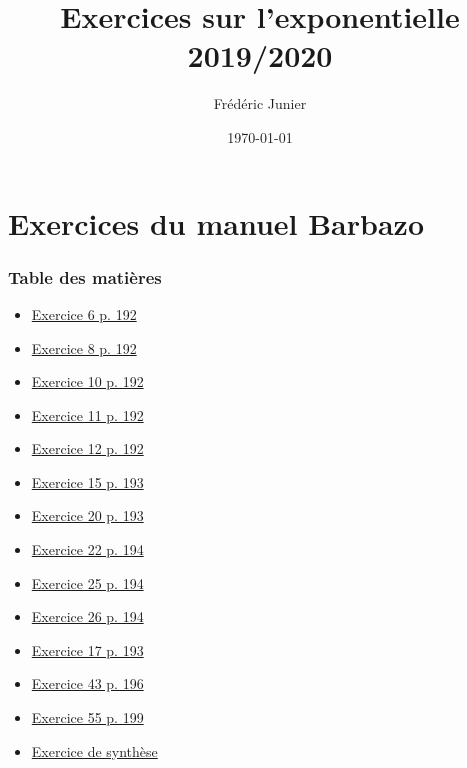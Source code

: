 \documentclass[11pt, hyperref={urlcolor=red,%
            linkcolor=blue, %
            colorlinks=true}]{beamer}
\title[exponentielle]{Exercices sur l'exponentielle 2019/2020}
\author[F.Junier]{Fr\'ed\'eric Junier}
\institute[Le Parc]{{\centering Lyc\'ee du Parc \\
1 Boulevard Anatole France \\ 69006 Lyon }}
\date[\today]{\today}
\begin{document}
\frame{\titlepage}

\section{Exercices du manuel Barbazo}

\label{barbazo}


\begin{frame}
\frametitle{Table des matières}
\begin{itemize}
	\item \hyperlink{exo6}{Exercice 6 p. 192}
    \item \hyperlink{exo8}{Exercice 8 p. 192}
    \item \hyperlink{exo10}{Exercice 10 p. 192}
    \item \hyperlink{exo11}{Exercice 11 p. 192}
    \item \hyperlink{exo12}{Exercice 12 p. 192}
    \item \hyperlink{exo15}{Exercice 15  p. 193}
    \item \hyperlink{exo20}{Exercice 20  p. 193}
    \item \hyperlink{exo22}{Exercice 22  p. 194}
    \item \hyperlink{exo25}{Exercice 25  p. 194}
      \item \hyperlink{exo26}{Exercice 26  p. 194}
        \item \hyperlink{exo17}{Exercice 17  p. 193}
          \item \hyperlink{exo43}{Exercice 43  p. 196}
            \item \hyperlink{exo55}{Exercice 55  p. 199}\\
                        \item \hyperlink{exosynthese}{Exercice de synthèse}
\end{itemize}

\end{frame}
\end{document}
